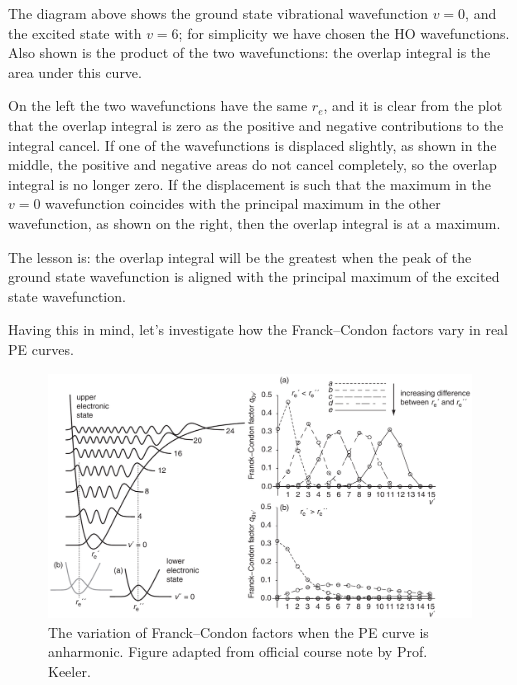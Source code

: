 \documentclass{article}
\theoremstyle{plain}\theoremheaderfont{\normalfont\itshape}\theorembodyfont{\rmfamily}\theoremseparator{.}\newtheorem*{rem}{Remark}\newtheorem*{ex}{Example}\newtheorem*{proof}{Proof}\newtheorem*{altp}{Alternative proof}
\theoremstyle{plain}\theoremheaderfont{\normalfont\bfseries}\theorembodyfont{\rmfamily}\theoremseparator{.}\newtheorem{thm}{Theorem}[section]\newtheorem{lem}[thm]{Lemma}\newtheorem{prop}[thm]{Proposition}\newtheorem*{cor}{Corollary}\newtheorem{defn}[thm]{Definition}\newtheorem{clm}[thm]{Claim}\newtheorem{clminproof}{Claim}\newtheorem{pos}{Postulate}[section]
\theoremstyle{break}\theoremheaderfont{\normalfont\itshape}\theorembodyfont{\rmfamily}\theoremseparator{.\medskip}\newtheorem*{proofskip}{Proof}\newtheorem*{exs}{Examples}\newtheorem*{rems}{Remarks}
\theoremstyle{break}\theoremheaderfont{\normalfont\bfseries}\theorembodyfont{\rmfamily}\theoremseparator{.\medskip}\newtheorem{lemskip}[thm]{Lemma}\newtheorem{defnskip}[thm]{Definition}\newtheorem{propskip}[thm]{Proposition}\newtheorem{thmskip}[thm]{Theorem}
\numberwithin{equation}{section}
\begin{document}
    The diagram above shows the ground state vibrational wavefunction \(v=0\), and the excited state with \(v=6\); for simplicity we have chosen the HO wavefunctions. Also shown is the product of the two wavefunctions: the overlap integral is the area under this curve.

    On the left the two wavefunctions have the same \(r_e\), and it is clear from the plot that the overlap integral is zero as the positive and negative contributions to the integral cancel. If one of the wavefunctions is displaced slightly, as shown in the middle, the positive and negative areas do not cancel completely, so the overlap integral is no longer zero. If the displacement is such that the maximum in the \(v=0\) wavefunction coincides with the principal maximum in the other wavefunction, as shown on the right, then the overlap integral is at a maximum.

    The lesson is: the overlap integral will be the greatest when the peak of the ground state wavefunction is aligned with the principal maximum of the excited state wavefunction.

    Having this in mind, let's investigate how the Franck--Condon factors vary in real PE curves.

    \begin{figure}
        \centering
        \includegraphics[width=\textwidth]{FC.png}
        \caption{The variation of Franck--Condon factors when the PE curve is anharmonic. Figure adapted from official course note by Prof. Keeler.}
    \end{figure}
\end{document}
